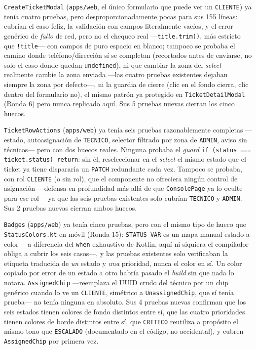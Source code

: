 \texttt{CreateTicketModal} (\texttt{apps/web}, el único formulario que puede ver un
\texttt{CLIENTE}) ya tenía cuatro pruebas, pero desproporcionadamente pocas para sus 155 líneas:
cubrían el caso feliz, la validación con campos literalmente vacíos, y el error genérico de
\emph{fallo} de red, pero no el chequeo real —\texttt{title.trim()}, más estricto que
\texttt{!title}— con campos de puro espacio en blanco; tampoco se probaba el camino donde
teléfono/dirección sí se completan (recortados antes de enviarse, no solo el caso donde quedan
\texttt{undefined}), ni que cambiar la zona del \emph{select} realmente cambie la zona enviada
—las cuatro pruebas existentes dejaban siempre la zona por defecto—, ni la guardia de cierre
(clic en el fondo cierra, clic dentro del formulario no), el mismo patrón ya protegido en
\texttt{TicketDetailModal} (Ronda 6) pero nunca replicado aquí. Sus 5 pruebas nuevas cierran los
cinco huecos.

\texttt{TicketRowActions} (\texttt{apps/web}) ya tenía seis pruebas razonablemente completas
—estado, autoasignación de \texttt{TECNICO}, selector filtrado por zona de \texttt{ADMIN}, aviso
sin técnicos— pero con dos huecos reales. Ninguna probaba el \emph{guard}
\texttt{if (status === ticket.status) return}: sin él, reseleccionar en el \emph{select} el
mismo estado que el ticket ya tiene dispararía un \texttt{PATCH} redundante cada vez. Tampoco se
probaba, con rol \texttt{CLIENTE} (o sin rol), que el componente no ofreciera ningún control de
asignación —defensa en profundidad más allá de que \texttt{ConsolePage} ya lo oculte para ese
rol— ya que las seis pruebas existentes solo cubrían \texttt{TECNICO} y \texttt{ADMIN}. Sus 2
pruebas nuevas cierran ambos huecos.

\texttt{Badges} (\texttt{apps/web}) ya tenía cinco pruebas, pero con el mismo tipo de hueco que
\texttt{StatusColors.kt} en móvil (Ronda 15): \texttt{STATUS\_VAR} es un mapa manual estado-a-color
—a diferencia del \texttt{when} exhaustivo de Kotlin, aquí ni siquiera el compilador obliga a
cubrir los seis casos—, y las pruebas existentes solo verificaban la etiqueta traducida de
\emph{un} estado y \emph{una} prioridad, nunca el color en sí. Un color copiado por error de un
estado a otro habría pasado el \emph{build} sin que nada lo notara. \texttt{AssignedChip}
—reemplaza el UUID crudo del técnico por un chip genérico cuando lo ve un \texttt{CLIENTE},
simétrico a \texttt{UnassignedChip}, que sí tenía prueba— no tenía ninguna en absoluto. Sus 4
pruebas nuevas confirman que los seis estados tienen colores de fondo distintos entre sí, que
las cuatro prioridades tienen colores de borde distintos entre sí, que \texttt{CRITICO} reutiliza
a propósito el mismo tono que \texttt{ESCALADO} (documentado en el código, no accidental), y
cubren \texttt{AssignedChip} por primera vez.

